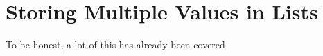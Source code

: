 \section{Storing Multiple Values in Lists}
\begin{multicols*}{2}
To be honest, a lot of this has already been covered 
\end{multicols*}